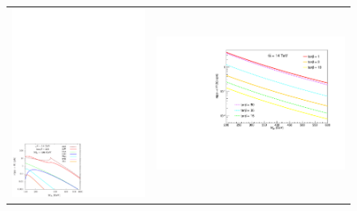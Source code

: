 \begin{figure}[htp]
\centering
\begin{tabular}{cc}
\hspace{0.3cm}
\includegraphics[trim={0cm 0.0cm 9.6cm 21.2cm},clip, scale=0.62]{fig/sm_beyond/Heavy_higgs_prod_xsec.pdf}
& \hspace{-0.3cm} \includegraphics[trim={0cm 0.0cm 0 1cm},clip, scale=0.4]{fig/sm_beyond/plots_xs_Htb_14TeV.pdf}\\

\end{tabular}
\end{figure}
